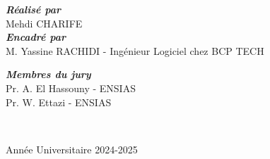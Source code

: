 \begin{titlepage}
\begin{center}
  \begin{minipage}{0.5\textwidth}
    \vspace{-6mm}
  \begin{flushleft} \large
    \emph{\bfseries Réalisé par}\\[0.3cm]
    Mehdi CHARIFE \\[0.5cm]
    \emph{\bfseries Encadré par} \\[0.3cm]
    M. Yassine RACHIDI - Ingénieur Logiciel chez BCP TECH
  \end{flushleft}
\end{minipage}
\begin{minipage}{0.4\textwidth}
  \begin{flushright} \large
    \emph{\bfseries Membres du jury} \\[0.3cm]
    Pr. A. El Hassouny - ENSIAS\\[0.3cm]
    Pr. W. Ettazi - ENSIAS \\

  \end{flushright}
\end{minipage}\\[1cm]


  
  
  

  \vspace{0.4cm} 	
  \begin{center}
    {Année Universitaire 2024-2025}
  \end{center}

   \end{center}
\end{titlepage}